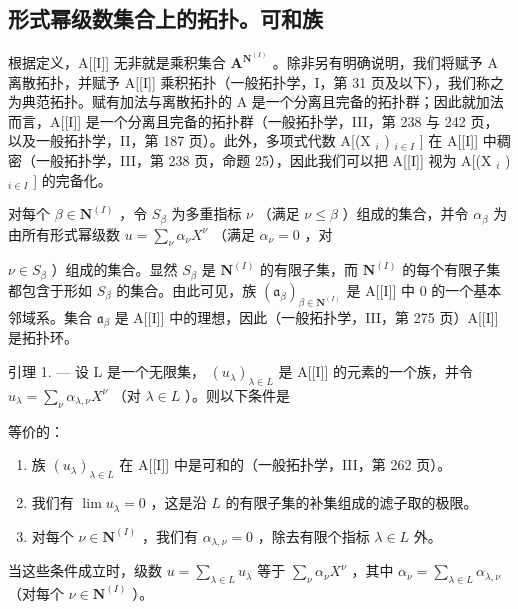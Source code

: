 \subsection{形式幂级数集合上的拓扑。可和族}

根据定义，A{[}{[}I{]}{]} 无非就是乘积集合 \(\mathbf{A}^{\mathbf{N}^{(I)}}\) 。除非另有明确说明，我们将赋予 A 离散拓扑，并赋予 A{[}{[}I{]}{]} 乘积拓扑（一般拓扑学，I，第 31 页及以下），我们称之为典范拓扑。赋有加法与离散拓扑的 A 是一个分离且完备的拓扑群；因此就加法而言，A{[}{[}I{]}{]} 是一个分离且完备的拓扑群（一般拓扑学，III，第 238 与 242 页，以及一般拓扑学，II，第 187 页）。此外，多项式代数 A{[}(X \(_{i}\) ) \(_{i\in I}\) {]} 在 A{[}{[}I{]}{]} 中稠密（一般拓扑学，III，第 238 页，命题 25），因此我们可以把 A{[}{[}I{]}{]} 视为 A{[}(X \(_{i}\) ) \(_{i\in I}\) {]} 的完备化。

对每个 \(\beta \in \mathbf{N}^{(I)}\) ，令 \(S_{\beta}\) 为多重指标 \(\nu\) （满足 \(\nu \leqslant \beta\) ）组成的集合，并令 \(\alpha_{\beta}\) 为由所有形式幂级数 \(u = \sum_{\nu} \alpha_{\nu} X^{\nu}\) （满足 \(\alpha_{\nu} = 0\) ，对

\(\nu \in S_{\beta}\) ）组成的集合。显然 \(S_{\beta}\) 是 \(\mathbf{N}^{(I)}\) 的有限子集，而 \(\mathbf{N}^{(I)}\) 的每个有限子集都包含于形如 \(S_{\beta}\) 的集合。由此可见，族 \((\mathfrak{a}_{\beta})_{\beta \in \mathbf{N}^{(I)}}\) 是 A{[}{[}I{]}{]} 中 0 的一个基本邻域系。集合 \(\mathfrak{a}_{\beta}\) 是 A{[}{[}I{]}{]} 中的理想，因此（一般拓扑学，III，第 275 页）A{[}{[}I{]}{]} 是拓扑环。

引理 1. --- 设 L 是一个无限集， \((u_{\lambda})_{\lambda \in L}\) 是 A{[}{[}I{]}{]} 的元素的一个族，并令 \(u_{\lambda} = \sum_{\nu} \alpha_{\lambda, \nu} X^{\nu}\) （对 \(\lambda \in L\) ）。则以下条件是

等价的：

\begin{enumerate}
\def\labelenumi{(\roman{enumi})}
\item
  族 \((u_{\lambda})_{\lambda \in L}\) 在 A{[}{[}I{]}{]} 中是可和的（一般拓扑学，III，第 262 页）。
\item
  我们有 \(\lim u_{\lambda} = 0\) ，这是沿 \(L\) 的有限子集的补集组成的滤子取的极限。
\item
  对每个 \(\nu \in \mathbf{N}^{(I)}\) ，我们有 \(\alpha_{\lambda, \nu} = 0\) ，除去有限个指标 \(\lambda \in L\) 外。
\end{enumerate}

当这些条件成立时，级数 \(u = \sum_{\lambda \in L} u_{\lambda}\) 等于 \(\sum_{\nu} \alpha_{\nu} X^{\nu}\) ，其中 \(\alpha_{\nu} = \sum_{\lambda \in L} \alpha_{\lambda, \nu}\) （对每个 \(\nu \in \mathbf{N}^{(I)}\) ）。

